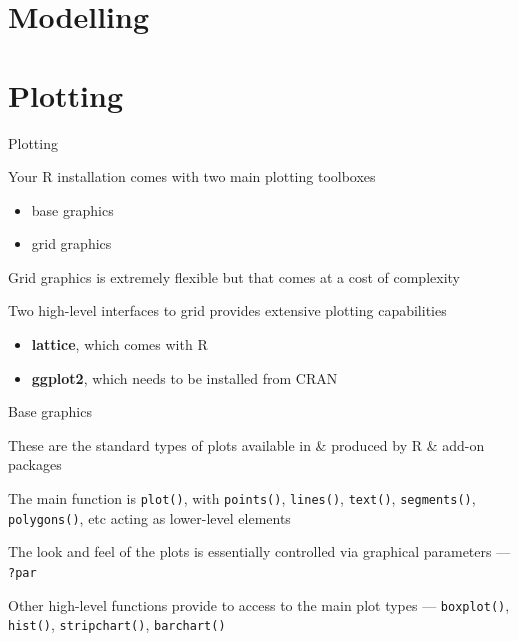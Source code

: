 \documentclass[10pt,ignorenonframetext,compress, aspectratio=169]{beamer}
\begin{document}
\section{Modelling}\label{modelling}

\section{Plotting}\label{plotting}

\begin{frame}{Plotting}

Your R installation comes with two main plotting toolboxes

\begin{itemize}
\itemsep1pt\parskip0pt
\item
  base graphics
\item
  grid graphics
\end{itemize}

Grid graphics is extremely flexible but that comes at a cost of
complexity

Two high-level interfaces to grid provides extensive plotting
capabilities

\begin{itemize}
\itemsep1pt\parskip0pt
\item
  \textbf{lattice}, which comes with R
\item
  \textbf{ggplot2}, which needs to be installed from CRAN
\end{itemize}

\end{frame}

\begin{frame}{Base graphics}

These are the standard types of plots available in \& produced by R \&
add-on packages

The main function is \texttt{plot()}, with \texttt{points()},
\texttt{lines()}, \texttt{text()}, \texttt{segments()},
\texttt{polygons()}, etc acting as lower-level elements

The look and feel of the plots is essentially controlled via
\alert{graphical parameters} --- \texttt{?par}

Other high-level functions provide to access to the main plot types ---
\texttt{boxplot()}, \texttt{hist()}, \texttt{stripchart()},
\texttt{barchart()}

\end{frame}
\end{document}
